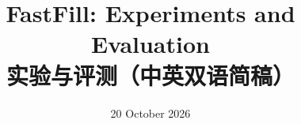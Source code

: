 \documentclass[10pt,a4paper,fontset=fandol]{ctexart}
\title{FastFill: Experiments and Evaluation\\[3pt]\large 实验与评测（中英双语简稿）}
\author{}
\date{20 October 2026}
\begin{document}
\pagestyle{plain}
\maketitle
\vspace{-1.6em}
\renewcommand{\tablename}{Table}

\clearpage
\renewcommand{\tablename}{表}

\renewcommand{\refname}{References / 参考文献}


\end{document}
